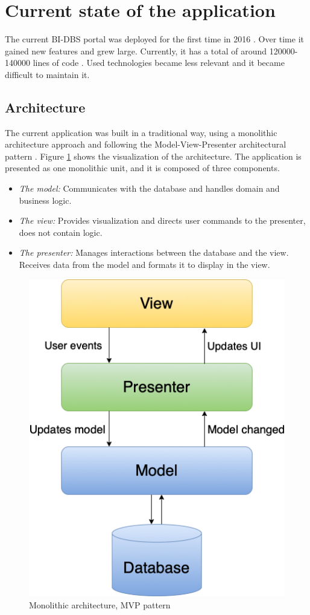 \section{Current state of the application}\label{sec12}
The current BI-DBS portal was deployed for the first time in 2016 \cite{bt-malec}. Over time it gained new features and grew large. Currently, it has a total of around 120000-140000 lines of code \cite{mt-plyskach}. Used technologies became less relevant and it became difficult to maintain it.

\subsection{Architecture}
The current application was built in a traditional way, using a monolithic architecture approach and following the Model-View-Presenter architectural pattern \cite{mvp-potel} \cite{architecture-haris}. Figure \ref{mon} shows the visualization of the architecture. The application is presented as one monolithic unit, and it is composed  of three components. 

\begin{itemize}
  \item \emph{The model:} Communicates with the database and handles domain and business logic.
  \item \emph{The view:} Provides visualization and directs user commands to the presenter, does not contain logic.
  \item \emph{The presenter:} Manages interactions between the database and the view. Receives data from the model and formats it to display in the view.
\end{itemize}

\begin{figure}[hp]
\centering
\includegraphics[scale=0.52]{../png/mvp_monolithic.png}
\caption{Monolithic architecture, MVP pattern}
\label{mon}
\end{figure}

